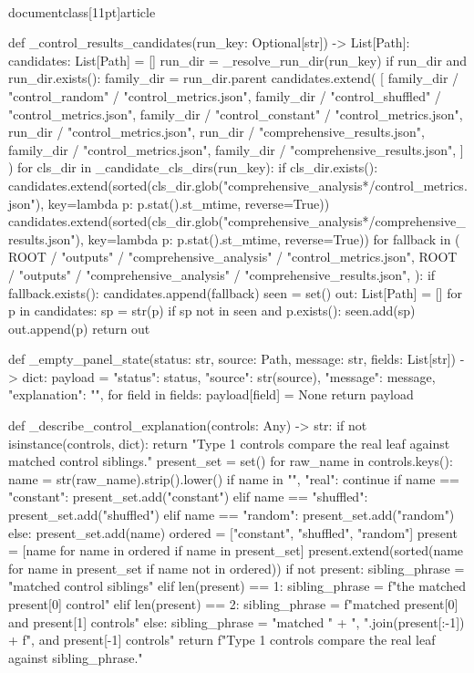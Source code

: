 \\documentclass[11pt]{article}
\begin{document}
\begin{CodeBlock}
{def _control_results_candidates(run_key: Optional[str]) -> List[Path]:
    candidates: List[Path] = []
    run_dir = _resolve_run_dir(run_key)
    if run_dir and run_dir.exists():
        family_dir = run_dir.parent
        candidates.extend(
            [
                family_dir / "control_random" / "control_metrics.json",
                family_dir / "control_shuffled" / "control_metrics.json",
                family_dir / "control_constant" / "control_metrics.json",
                run_dir / "control_metrics.json",
                run_dir / "comprehensive_results.json",
                family_dir / "control_metrics.json",
                family_dir / "comprehensive_results.json",
            ]
        )
        for cls_dir in _candidate_cls_dirs(run_key):
            if cls_dir.exists():
                candidates.extend(sorted(cls_dir.glob("comprehensive_analysis*/control_metrics.json"), key=lambda p: p.stat().st_mtime, reverse=True))
                candidates.extend(sorted(cls_dir.glob("comprehensive_analysis*/comprehensive_results.json"), key=lambda p: p.stat().st_mtime, reverse=True))
    for fallback in (
        ROOT / "outputs" / "comprehensive_analysis" / "control_metrics.json",
        ROOT / "outputs" / "comprehensive_analysis" / "comprehensive_results.json",
    ):
        if fallback.exists():
            candidates.append(fallback)
    seen = set()
    out: List[Path] = []
    for p in candidates:
        sp = str(p)
        if sp not in seen and p.exists():
            seen.add(sp)
            out.append(p)
    return out


def _empty_panel_state(status: str, source: Path, message: str, fields: List[str]) -> dict:
    payload = {
        "status": status,
        "source": str(source),
        "message": message,
        "explanation": "",
    }
    for field in fields:
        payload[field] = None
    return payload


def _describe_control_explanation(controls: Any) -> str:
    if not isinstance(controls, dict):
        return "Type 1 controls compare the real leaf against matched control siblings."
    present_set = set()
    for raw_name in controls.keys():
        name = str(raw_name).strip().lower()
        if name in {"", "real"}:
            continue
        if name == "constant":
            present_set.add("constant")
        elif name == "shuffled":
            present_set.add("shuffled")
        elif name == "random":
            present_set.add("random")
        else:
            present_set.add(name)
    ordered = ["constant", "shuffled", "random"]
    present = [name for name in ordered if name in present_set]
    present.extend(sorted(name for name in present_set if name not in ordered))
    if not present:
        sibling_phrase = "matched control siblings"
    elif len(present) == 1:
        sibling_phrase = f"the matched {present[0]} control"
    elif len(present) == 2:
        sibling_phrase = f"matched {present[0]} and {present[1]} controls"
    else:
        sibling_phrase = "matched " + ", ".join(present[:-1]) + f", and {present[-1]} controls"
    return f"Type 1 controls compare the real leaf against {sibling_phrase}."


}
\end{CodeBlock}
\end{document}
